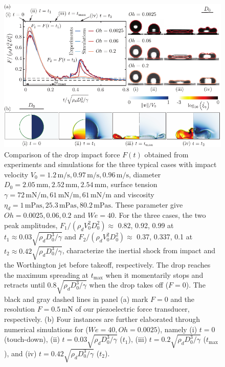 \documentclass[]{article}
\newcommand{\oo}{\color{magenta} \normalfont}
\begin{document}
\begin{enumerate}
	\begin{figure}
		\centering
		\includegraphics[width=\textwidth]{../Main/Figures/Figure1_summary_v6.pdf}
		\caption{{\oo Comparison of the drop impact force $F(t)$ obtained from experiments and simulations for the three typical cases with impact velocity $V_0 = 1.2\,\si{\meter}/\si{\second}, 0.97\,\si{\meter}/\si{\second}, 0.96\,\si{\meter}/\si{\second}$, diameter $D_0 = 2.05\,\si{\milli\meter}, 2.52\,\si{\milli\meter}, 2.54\,\si{\milli\meter}$, surface tension $\gamma = 72\,\si{\milli\newton}/\si{\meter}, 61\,\si{\milli\newton}/\si{\meter}, 61\,\si{\milli\newton}/\si{\meter}$ and viscosity $\eta_d = 1\,\si{\milli\pascal\second}, 25.3\,\si{\milli\pascal\second}, 80.2\,\si{\milli\pascal\second}$. These parameter give $Oh = 0.0025, 0.06, 0.2$ and $We = 40$.
		For the three cases, the two peak amplitudes, $F_1/(\rho_dV_0^2D_0^2) \approx$ 0.82, 0.92, 0.99 at $t_1 \approx 0.03\sqrt{\rho_dD_0^3/\gamma}$ and $F_2/(\rho_dV_0^2D_0^2) \approx$ 0.37, 0.337, 0.1 at $t_2 \approx 0.42\sqrt{\rho_dD_0^3/\gamma}$, characterize the inertial shock from impact and the Worthington jet before takeoff, respectively. 
		The drop reaches the maximum spreading at $t_{\text{max}}$ when it momentarily stops and retracts until $0.8\sqrt{\rho_dD_0^3/\gamma}$ when the drop takes off ($F = 0$). The black and gray dashed lines in panel (a) mark $F = 0$ and the resolution $F = 0.5\,\si{\milli\newton}$ of our piezoelectric force transducer, respectively.
		(b) Four instances are further elaborated through numerical simulations for ($We = 40, Oh = 0.0025$), namely (i) $t = 0$ (touch-down), (ii) $t = 0.03\sqrt{\rho_dD_0^3/\gamma}$ ($t_1$), (iii) $t = 0.2\sqrt{\rho_dD_0^3/\gamma}$ ($t_{\text{max}}$), and (iv) $t = 0.42\sqrt{\rho_dD_0^3/\gamma}$ ($t_2$).
}}
\end{figure}
\end{enumerate}
\end{document}
